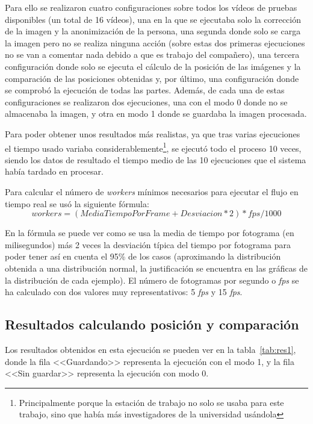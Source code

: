 {Para ello se realizaron cuatro configuraciones sobre todos los vídeos de pruebas disponibles (un total de 16 vídeos), una en la que se ejecutaba solo la corrección de la imagen y la anonimización de la persona, una segunda donde solo se carga la imagen pero no se realiza ninguna acción (sobre estas dos primeras ejecuciones no se van a comentar nada debido a que es trabajo del compañero), una tercera configuración donde solo se ejecuta el cálculo de la posición de las imágenes y la comparación de las posiciones obtenidas y, por último, una configuración donde se comprobó la ejecución de todas las partes. Además, de cada una de estas configuraciones se realizaron dos ejecuciones, una con el modo 0 donde no se almacenaba la imagen, y otra en modo 1 donde se guardaba la imagen procesada.

Para poder obtener unos resultados más realistas, ya que tras varias ejecuciones el tiempo usado variaba considerablemente\footnote{Principalmente porque la estación de trabajo no solo se usaba para este trabajo, sino que había más investigadores de la universidad usándola}, se ejecutó todo el proceso 10 veces, siendo los datos de resultado el tiempo medio de las 10 ejecuciones que el sistema había tardado en procesar.

Para calcular el número de \textit{workers} mínimos necesarios para ejecutar el flujo en tiempo real se usó la siguiente fórmula:
\begin{equation}
workers = (MediaTiempoPorFrame + Desviacion*2)*fps/1000
\end{equation}

En la fórmula se puede ver como se usa la media de tiempo por fotograma (en milisegundos) más 2 veces la desviación típica del tiempo por fotograma para poder tener así en cuenta el 95\% de los casos (aproximando la distribución obtenida a una distribución normal, la justificación se encuentra en las gráficas de la distribución de cada ejemplo). El número de fotogramas por segundo o \textit{fps} se ha calculado con dos valores muy representativos: 5 \textit{fps} y 15 \textit{fps}.

\subsection{Resultados calculando posición y comparación}
Los resultados obtenidos en esta ejecución se pueden ver en la tabla~\ref{tab:res1}, donde la fila <<Guardando>> representa la ejecución con el modo 1, y la fila <<Sin guardar>> representa la ejecución con modo 0.

}
